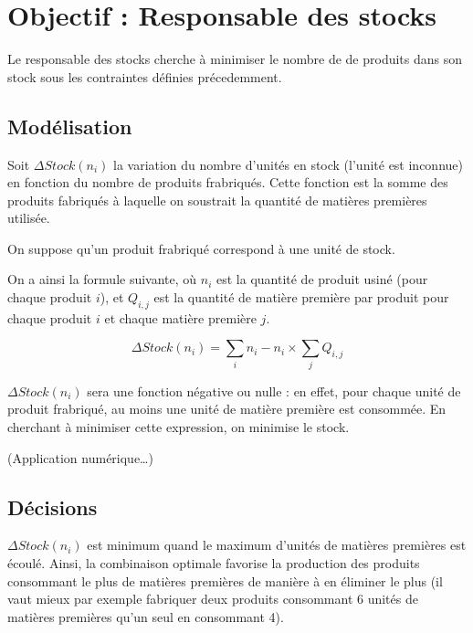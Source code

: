 \newpage
\section{Objectif : Responsable des stocks}
Le responsable des stocks cherche à minimiser le nombre de de produits dans
son stock sous les contraintes définies précedemment.

\subsection{Modélisation}
Soit $\Delta Stock(n_{i})$ la variation du nombre d'unités en stock (l'unité est
inconnue) en fonction du nombre de produits frabriqués. Cette fonction est la
somme des produits fabriqués à laquelle on soustrait la quantité de matières
premières utilisée.

On suppose qu'un produit frabriqué correspond à une unité de stock.

On a ainsi la formule suivante, où $n_{i}$ est la quantité de produit usiné
(pour chaque produit $i$), et $Q_{i,j}$ est la quantité de matière première par
produit pour chaque produit $i$ et chaque matière première $j$.

\begin{equation}
	\Delta Stock(n_{i}) = \sum_{i} n_{i} - n_{i} \times \sum_{j} Q_{i,j}
\end{equation}

$\Delta Stock(n_{i})$ sera une fonction négative ou nulle : en effet, pour
chaque unité de produit frabriqué, au moins une unité de matière première est
consommée. En cherchant à minimiser cette expression, on minimise le stock.

(Application numérique\ldots)

\subsection{Décisions}
$\Delta Stock(n_{i})$ est minimum quand le maximum d'unités de matières
premières est écoulé. Ainsi, la combinaison optimale favorise la production des
produits consommant le plus de matières premières de manière à en éliminer le
plus (il vaut mieux par exemple fabriquer deux produits consommant 6 unités de
matières premières qu'un seul en consommant 4).